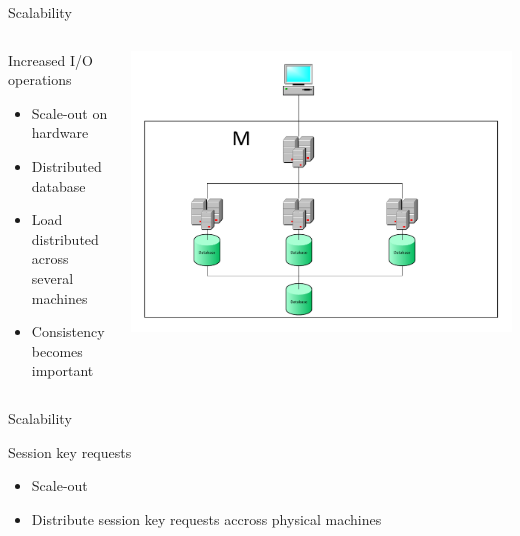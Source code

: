 \begin{frame}{Scalability}{}
  \begin{columns}[T]
    \begin{column}{.5\textwidth}
     \begin{block}{Increased I/O operations}
  \begin{itemize}
    \item Scale-out on hardware
    \item Distributed database
    \item Load distributed across several machines
    \item Consistency becomes important
  \end{itemize}
\end{block}
\end{column}
    \begin{column}{.5\textwidth}
    \begin{block}{}
    \begin{center}
    \includegraphics[width=1\textwidth]{images/master_scaling.pdf}
    \end{center}
    \end{block}
    \end{column}
    \end{columns}
\end{frame}

\begin{frame}{Scalability}{}
\begin{block}{Session key requests}
  \begin{itemize}
    \item Scale-out
    \item Distribute session key requests accross physical machines
  \end{itemize}
\end{block}
\end{frame}

